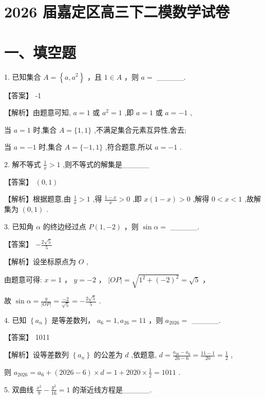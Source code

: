 \documentclass[10pt]{article}
\begin{document}
\section*{2026 届嘉定区高三下二模数学试卷}

\section*{一、填空题}

1. 已知集合 \(A = \left\{  {a,{a}^{2}}\right\}\) ，且 \(1 \in  A\) ，则 \(a =\) \_\_\_\_\_.

【答案】 -1

【解析】由题意可知, \(a = 1\) 或 \({a}^{2} = 1\) ,即 \(a = 1\) 或 \(a =  - 1\) ,

当 \(a = 1\) 时,集合 \(A = \{ 1,1\}\) ,不满足集合元素互异性,舍去;

当 \(a =  - 1\) 时,集合 \(A = \{  - 1,1\}\) ,符合题意,所以 \(a =  - 1\) .

2. 解不等式 \(\frac{1}{x} > 1\) ,则不等式的解集是\_\_\_\_\_

【答案】 \(\left( {0,1}\right)\)

【解析】根据题意,由 \(\frac{1}{x} > 1\) ,得 \(\frac{1 - x}{x} > 0\) ,即 \(x\left( {1 - x}\right)  > 0\) ,解得 \(0 < x < 1\) ,故解集为 \(\left( {0,1}\right)\) .

3. 已知角 \(\alpha\) 的终边经过点 \(P\left( {1, - 2}\right)\) ，则 \(\sin \alpha  =\) \_\_\_\_\_.

【答案】 \(- \frac{2\sqrt{5}}{5}\)

【解析】设坐标原点为 \(O\) ,

由题意可得: \(x = 1\) ， \(y =  - 2\) ， \(\left| {OP}\right|  = \sqrt{{1}^{2} + {\left( -2\right) }^{2}} = \sqrt{5}\) ，

故 \(\sin \alpha  = \frac{y}{\left| OP\right| } = \frac{-2}{\sqrt{5}} =  - \frac{2\sqrt{5}}{5}\) .

4. 已知 \(\left\{  {a}_{n}\right\}\) 是等差数列， \({a}_{6} = 1,{a}_{26} = {11}\) ，则 \({a}_{2026} =\) \_\_\_\_\_.

【答案】 1011

【解析】设等差数列 \(\left\{  {a}_{n}\right\}\) 的公差为 \(d\) ,依题意, \(d = \frac{{a}_{26} - {a}_{6}}{{26} - 6} = \frac{{11} - 1}{20} = \frac{1}{2}\) ,

则 \({a}_{2026} = {a}_{6} + \left( {{2026} - 6}\right)  \times  d = 1 + {2020} \times  \frac{1}{2} = {1011}\) .

5. 双曲线 \(\frac{{x}^{2}}{9} - \frac{{y}^{2}}{16} = 1\) 的渐近线方程是\_\_\_\_\_.
\end{document}
